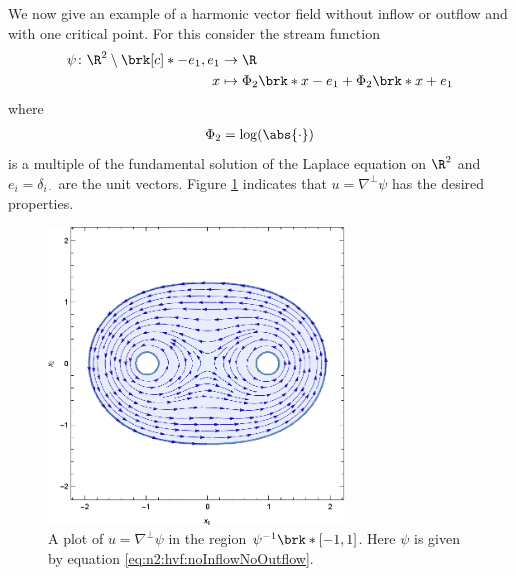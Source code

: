 We now give an example of a harmonic vector field without 
inflow or outflow and with one critical point.
For this consider the stream function
\begin{equation}
  \begin{aligned}
  \psi\colon\R^2\setminus\brk[c]*{-e_1,e_1}&\to\R \\
  x&\mapsto\Phi_2\brk*{x-e_1}+\Phi_2\brk*{x+e_1}
  \end{aligned}\label{eq:n2:hvf:noInflowNoOutflow}
\end{equation}
where
\begin{align*}
  \Phi_2=\log(\abs{\cdot})
\end{align*}
is a multiple of the fundamental solution of the Laplace equation on $\R^2$ and $e_i=\delta_{i\cdot}$ are the unit vectors.
Figure \ref{pl:n2_hvf_noInflowNoOutflow} indicates that $u=\nabla^\perp\psi$ has the desired properties.
\begin{figure}
  \centering
  \includegraphics[width=0.7\textwidth]{../Plots/HarmonicVectorFields_gr1.eps}
  \caption{A plot of $u=\nabla^\perp\psi$ in the region $\psi^{-1}\brk*{[-1,1]}$.
    Here $\psi$ is given by equation \eqref{eq:n2:hvf:noInflowNoOutflow}.}
  \label{pl:n2_hvf_noInflowNoOutflow}
\end{figure}

